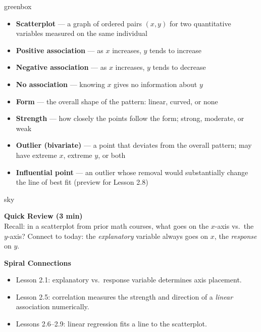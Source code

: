 \documentclass[10pt]{article}
\begin{document}
\begin{skillbox}{greenbox}
\begin{minipage}[t]{0.48\linewidth}
    \begin{itemize}
        \item \textbf{Scatterplot} --- a graph of ordered pairs $(x, y)$ for two quantitative variables measured on the same individual
        \item \textbf{Positive association} --- as $x$ increases, $y$ tends to increase
        \item \textbf{Negative association} --- as $x$ increases, $y$ tends to decrease
        \item \textbf{No association} --- knowing $x$ gives no information about $y$
    \end{itemize}
\end{minipage}
\hfill
\begin{minipage}[t]{0.48\linewidth}
    \begin{itemize}
        \item \textbf{Form} --- the overall shape of the pattern: linear, curved, or none
        \item \textbf{Strength} --- how closely the points follow the form; strong, moderate, or weak
        \item \textbf{Outlier (bivariate)} --- a point that deviates from the overall pattern; may have extreme $x$, extreme $y$, or both
        \item \textbf{Influential point} --- an outlier whose removal would substantially change the line of best fit (preview for Lesson 2.8)
    \end{itemize}
\end{minipage}
\end{skillbox}

\begin{skillbox}{sky}
\begin{minipage}[t]{0.48\linewidth}
    \textbf{Quick Review (3 min)}\\
    Recall: in a scatterplot from prior math courses, what goes on the $x$-axis vs.\ the $y$-axis?
    Connect to today: the \textit{explanatory} variable always goes on $x$, the \textit{response} on $y$.
\end{minipage}
\hfill
\begin{minipage}[t]{0.48\linewidth}
    \textbf{Spiral Connections}
    \begin{itemize}
        \item Lesson 2.1: explanatory vs.\ response variable determines axis placement.
        \item Lesson 2.5: correlation measures the strength and direction of a \textit{linear} association numerically.
        \item Lessons 2.6--2.9: linear regression fits a line to the scatterplot.
    \end{itemize}
\end{minipage}
\end{skillbox}
\end{document}

